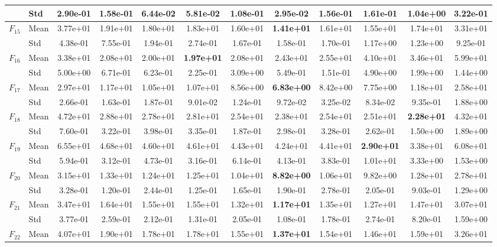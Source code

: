 \begin{center}
\begin{longtable}{clcccccccccc}
 & Std & 2.90e-01 & 1.58e-01 & 6.44e-02 & 5.81e-02 & 1.08e-01 & 2.95e-02 & 1.56e-01 & 1.61e-01 & 1.04e+00 & 3.22e-01 \\
\midrule
$F_{15}$ & Mean & 3.77e+01 & 1.91e+01 & 1.80e+01 & 1.83e+01 & 1.60e+01 & \textbf{1.41e+01} & 1.61e+01 & 1.55e+01 & 1.74e+01 & 3.31e+01 \\
 & Std & 4.38e-01 & 7.55e-01 & 1.94e-01 & 2.74e-01 & 1.67e-01 & 1.58e-01 & 1.70e-01 & 1.17e+00 & 1.23e+00 & 9.25e-01 \\
\midrule
$F_{16}$ & Mean & 3.38e+01 & 2.08e+01 & 2.00e+01 & \textbf{1.97e+01} & 2.08e+01 & 2.43e+01 & 2.55e+01 & 4.10e+01 & 3.46e+01 & 5.99e+01 \\
 & Std & 5.00e+00 & 6.71e-01 & 6.23e-01 & 2.25e-01 & 3.09e+00 & 5.49e-01 & 1.51e-01 & 4.90e+00 & 1.99e+00 & 1.44e+00 \\
\midrule
$F_{17}$ & Mean & 2.97e+01 & 1.17e+01 & 1.05e+01 & 1.07e+01 & 8.56e+00 & \textbf{6.83e+00} & 8.42e+00 & 7.75e+00 & 1.18e+01 & 2.58e+01 \\
 & Std & 2.66e-01 & 1.63e-01 & 1.87e-01 & 9.01e-02 & 1.24e-01 & 9.72e-02 & 3.25e-02 & 8.34e-02 & 9.35e-01 & 1.88e+00 \\
\midrule
$F_{18}$ & Mean & 4.72e+01 & 2.88e+01 & 2.78e+01 & 2.81e+01 & 2.54e+01 & 2.38e+01 & 2.54e+01 & 2.51e+01 & \textbf{2.28e+01} & 4.32e+01 \\
 & Std & 7.60e-01 & 3.22e-01 & 3.98e-01 & 3.35e-01 & 1.87e-01 & 2.98e-01 & 3.28e-01 & 2.62e-01 & 1.50e+00 & 1.89e+00 \\
\midrule
$F_{19}$ & Mean & 6.55e+01 & 4.68e+01 & 4.60e+01 & 4.61e+01 & 4.43e+01 & 4.24e+01 & 4.41e+01 & \textbf{2.90e+01} & 3.38e+01 & 6.08e+01 \\
 & Std & 5.94e-01 & 3.12e-01 & 4.73e-01 & 3.16e-01 & 6.14e-01 & 4.13e-01 & 3.83e-01 & 1.01e+01 & 3.33e+00 & 1.53e+00 \\
\midrule
$F_{20}$ & Mean & 3.15e+01 & 1.33e+01 & 1.24e+01 & 1.25e+01 & 1.04e+01 & \textbf{8.82e+00} & 1.06e+01 & 9.82e+00 & 1.28e+01 & 2.78e+01 \\
 & Std & 3.28e-01 & 1.20e-01 & 2.44e-01 & 1.25e-01 & 1.65e-01 & 1.90e-01 & 2.78e-01 & 2.05e-01 & 9.03e-01 & 1.29e+00 \\
\midrule
$F_{21}$ & Mean & 3.47e+01 & 1.64e+01 & 1.55e+01 & 1.55e+01 & 1.32e+01 & \textbf{1.17e+01} & 1.35e+01 & 1.27e+01 & 1.47e+01 & 3.07e+01 \\
 & Std & 3.77e-01 & 2.59e-01 & 2.12e-01 & 1.31e-01 & 2.05e-01 & 1.08e-01 & 1.78e-01 & 2.74e-01 & 8.20e-01 & 1.59e+00 \\
\midrule
$F_{22}$ & Mean & 4.07e+01 & 1.90e+01 & 1.78e+01 & 1.78e+01 & 1.55e+01 & \textbf{1.37e+01} & 1.54e+01 & 1.46e+01 & 1.59e+01 & 3.26e+01 \\

\end{longtable}
\end{center}
